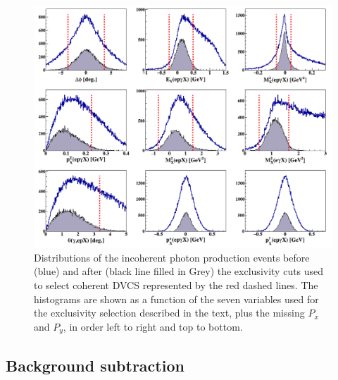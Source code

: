 \documentclass[aps,prc,preprint,superscriptaddress]{revtex4}
\begin{document}
\begin{figure}[tbp!]
\center
\includegraphics[trim=10 10 10 
   5,clip,width=16.5cm]{fig3/all_incoh_exc_cuts.png}
\caption{Distributions of the incoherent photon production events before (blue) 
   and after (black line filled
	in Grey) the exclusivity cuts used to select coherent DVCS represented by the 
	red dashed lines. The histograms are shown as a function of the 
	seven variables used for the exclusivity selection described in the text, 
	plus the missing $P_x$ and $P_y$, in order left to right and top to bottom.}
\label{fig:IncExcCuts}
\end{figure}

\subsection{Background subtraction}
\end{document}
